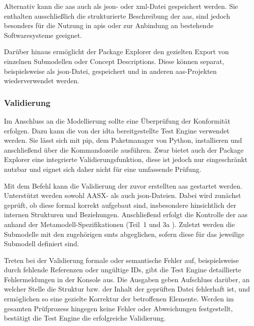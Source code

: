 Alternativ kann die \acs{aas} auch als \ac{json}- oder \ac{xml}-Datei gespeichert werden.
Sie enthalten ausschließlich die strukturierte Beschreibung der \acs{aas}, sind jedoch besonders für die Nutzung in \acsp{api} oder zur Anbindung an bestehende Softwaresysteme geeignet.

Darüber hinaus ermöglicht der Package Explorer den gezielten Export von einzelnen \mbox{Submodellen} oder Concept Descriptions.
Diese können separat, beispielsweise als \acs{json}-Datei, gespeichert und in anderen \acs{aas}-Projekten wiederverwendet werden.

\subsubsection{Validierung}

Im Anschluss an die Modellierung sollte eine Überprüfung der Konformität erfolgen. 
Dazu kann die von der \acs{idta} bereitgestellte Test Engine \cite{TestEngine} verwendet werden. 
Sie lässt sich mit pip, dem Paketmanager von Python, installieren und anschließend über die Kommandozeile ausführen. 
Zwar bietet auch der Package Explorer eine integrierte Validierungsfunktion, diese ist jedoch nur eingeschränkt nutzbar und eignet sich daher nicht für eine umfassende Prüfung.

Mit dem Befehl 
kann die Validierung der zuvor erstellten \acs{aas} gestartet werden.
Unterstützt werden sowohl AASX- als auch \acs{json}-Dateien. 
Dabei wird zunächst geprüft, ob diese formal korrekt aufgebaut sind, insbesondere hinsichtlich der internen Strukturen und Beziehungen. 
Anschließend erfolgt die Kontrolle der \acs{aas} anhand der Metamodell-Spezifikationen (Teil~1 \cite{SpezifikationPart1} und 3a \cite{SpezifikationPart3a}). 
Zuletzt werden die Submodelle mit den zugehörigen \acsp{smt} abgeglichen, sofern diese für das jeweilige Submodell definiert sind.

\newpage
Treten bei der Validierung formale oder semantische Fehler auf, beispielsweise durch fehlende Referenzen oder ungültige IDs, gibt die Test Engine detaillierte Fehlermeldungen in der Konsole aus. 
Die Ausgaben geben Aufschluss darüber, an welcher Stelle die Struktur bzw. der Inhalt der geprüften Datei fehlerhaft ist, und ermöglichen so eine gezielte Korrektur der betroffenen Elemente. 
Werden im gesamten Prüfprozess hingegen keine Fehler oder Abweichungen festgestellt, bestätigt die Test Engine die erfolgreiche Validierung.

